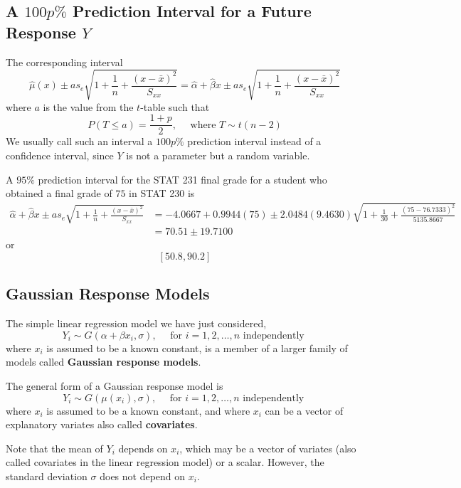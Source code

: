 \subsection{A $ 100p\% $ Prediction Interval for a Future Response $ Y $}
The corresponding interval
\[\hat{\mu}(x) \pm a s_{e} \sqrt{1+\frac{1}{n}+\frac{(x-\bar{x})^{2}}{S_{x x}}}=\hat{\alpha}+\hat{\beta} x \pm a s_{e} \sqrt{1+\frac{1}{n}+\frac{(x-\bar{x})^{2}}{S_{x x}}}\]
where $ a $ is the value from the $ t $-table such that
\[P(T \leq a)=\frac{1+p}{2}, \quad \text { where } T \sim t(n-2)\]
We usually call such an interval a $ 100p\% $ prediction interval instead of a confidence interval,
since $ Y $ is not a parameter but a random variable.

\begin{exbox}
    \begin{example}
        A $ 95\% $ prediction interval for the STAT 231 final grade for a student who obtained
        a final grade of $ 75 $ in STAT 230 is
        \begin{align*}
            \hat{\alpha}+\hat{\beta} x \pm a s_{e} \sqrt{1+\frac{1}{n}+\frac{(x-\bar{x})^{2}}{S_{x x}}}
             & =-4.0667+0.9944(75) \pm 2.0484(9.4630) \sqrt{1+\frac{1}{30}+\frac{(75-76.7333)^{2}}{5135.8667}} \\
             & =70.51 \pm 19.7100
        \end{align*}
        or
        \[ \left[ 50.8,90.2 \right] \]
    \end{example}
\end{exbox}

\subsection{Gaussian Response Models}
The simple linear regression model we have just considered,
\[ Y_i \sim G(\alpha+\beta x_i,\sigma),\quad \text { for } i=1,2, \ldots, n \text { independently } \]
where $ x_i $ is assumed to be a known constant, is a member of a larger family of models
called \textbf{Gaussian response models}.

The general form of a Gaussian response model is
\[Y_{i} \sim G\left(\mu\left(x_{i}\right), \sigma\right), \quad \text { for } i=1,2, \ldots, n \text { independently }\]
where $ x_i $ is assumed to be a known constant, and where $ x_i $ can be a vector of explanatory
variates also called \textbf{covariates}.

Note that the mean of $ Y_i $ depends on $ x_i $, which may be a vector of variates (also called
covariates in the linear regression model) or a scalar. However, the standard deviation $ \sigma $
does not depend on $ x_i $.

